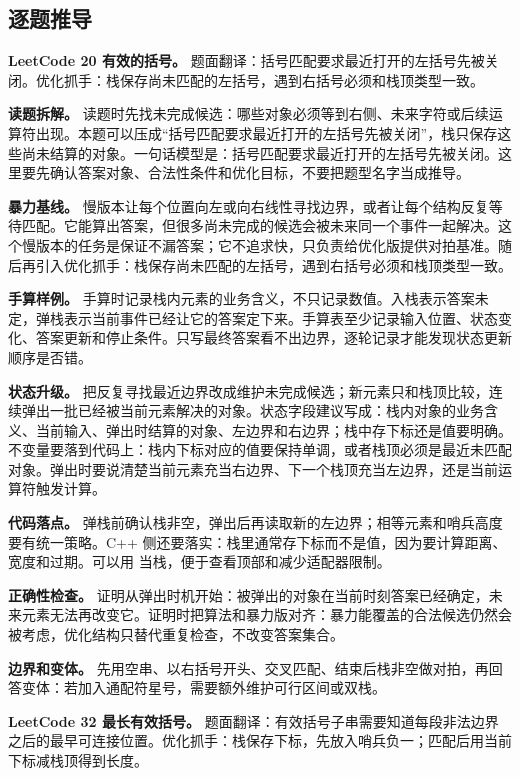 \subsection{逐题推导}

\noindent\textbf{LeetCode 20 有效的括号。} 题面翻译：括号匹配要求最近打开的左括号先被关闭。优化抓手：栈保存尚未匹配的左括号，遇到右括号必须和栈顶类型一致。

\textbf{读题拆解。} 读题时先找未完成候选：哪些对象必须等到右侧、未来字符或后续运算符出现。本题可以压成“括号匹配要求最近打开的左括号先被关闭”，栈只保存这些尚未结算的对象。一句话模型是：括号匹配要求最近打开的左括号先被关闭。这里要先确认答案对象、合法性条件和优化目标，不要把题型名字当成推导。

\textbf{暴力基线。} 慢版本让每个位置向左或向右线性寻找边界，或者让每个结构反复等待匹配。它能算出答案，但很多尚未完成的候选会被未来同一个事件一起解决。这个慢版本的任务是保证不漏答案；它不追求快，只负责给优化版提供对拍基准。随后再引入优化抓手：栈保存尚未匹配的左括号，遇到右括号必须和栈顶类型一致。

\textbf{手算样例。} 手算时记录栈内元素的业务含义，不只记录数值。入栈表示答案未定，弹栈表示当前事件已经让它的答案定下来。手算表至少记录输入位置、状态变化、答案更新和停止条件。只写最终答案看不出边界，逐轮记录才能发现状态更新顺序是否错。

\textbf{状态升级。} 把反复寻找最近边界改成维护未完成候选；新元素只和栈顶比较，连续弹出一批已经被当前元素解决的对象。状态字段建议写成：栈内对象的业务含义、当前输入、弹出时结算的对象、左边界和右边界；栈中存下标还是值要明确。不变量要落到代码上：栈内下标对应的值要保持单调，或者栈顶必须是最近未匹配对象。弹出时要说清楚当前元素充当右边界、下一个栈顶充当左边界，还是当前运算符触发计算。

\textbf{代码落点。} 弹栈前确认栈非空，弹出后再读取新的左边界；相等元素和哨兵高度要有统一策略。C++ 侧还要落实：栈里通常存下标而不是值，因为要计算距离、宽度和过期。可以用  当栈，便于查看顶部和减少适配器限制。

\textbf{正确性检查。} 证明从弹出时机开始：被弹出的对象在当前时刻答案已经确定，未来元素无法再改变它。证明时把算法和暴力版对齐：暴力能覆盖的合法候选仍然会被考虑，优化结构只替代重复检查，不改变答案集合。

\textbf{边界和变体。} 先用空串、以右括号开头、交叉匹配、结束后栈非空做对拍，再回答变体：若加入通配符星号，需要额外维护可行区间或双栈。

\noindent\textbf{LeetCode 32 最长有效括号。} 题面翻译：有效括号子串需要知道每段非法边界之后的最早可连接位置。优化抓手：栈保存下标，先放入哨兵负一；匹配后用当前下标减栈顶得到长度。

